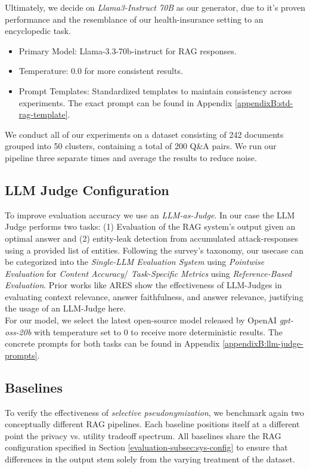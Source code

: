 Ultimately, we decide on \textit{Llama3-Instruct 70B} as our generator, due to it's proven performance and the resemblance of our health-insurance setting to an encyclopedic task.

\begin{itemize}
  \item Primary Model: Llama-3.3-70b-instruct for {RAG} responses.
  \item Temperature: 0.0 for more consistent results.
  \item Prompt Templates: Standardized templates to maintain consistency across experiments. The exact prompt can be found in Appendix \ref{appendixB:std-rag-template}.
\end{itemize}

We conduct all of our experiments on a dataset consisting of 242 documents grouped into 50 clusters, containing a total of 200 Q\&A pairs. We run our pipeline three separate times and average the results to reduce noise. %

\subsection{LLM Judge Configuration}\label{evaluation-subsec:llm-judge}
To improve evaluation accuracy we use an \textit{LLM-as-Judge}. In our case the LLM Judge performs two tasks: (1) Evaluation of the {RAG} system's output given an optimal answer and (2) entity-leak detection from accumulated attack-responses using a provided list of entities.  Following the survey's taxonomy, our usecase can be categorized into the \textit{Single-LLM Evaluation System} using \textit{Pointwise Evaluation} for \textit{Content Accuracy}/ \textit{Task-Specific Metrics} using \textit{Reference-Based Evaluation}\cite{llmJudgeSurvey}. Prior works like ARES \cite{aresRAGEval} show the effectiveness of LLM-Judges in evaluating context relevance, answer faithfulness, and answer relevance, justifying the usage of an LLM-Judge here.\\
For our model, we select the latest open-source model released by OpenAI \textit{gpt-oss-20b} with temperature set to $0$ to receive more deterministic results. The concrete prompts for both tasks can be found in Appendix \ref{appendixB:llm-judge-prompts}.




\subsection{Baselines}\label{evaluation-subsec:baselines}
To verify the effectiveness of \textit{selective pseudonymization}, we benchmark again two conceptually different {RAG} pipelines. Each baseline positions itself at a different point the privacy vs. utility tradeoff spectrum. All baselines share the {RAG} configuration specified in Section \ref{evaluation-subsec:sys-config} to ensure that differences in the output stem solely from the varying treatment of the dataset.

